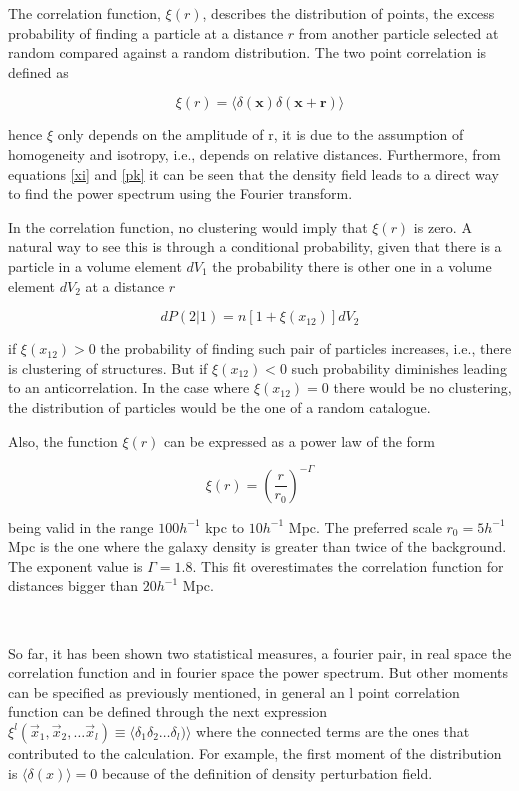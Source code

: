 The correlation function, $\xi(r)$, describes the distribution of points, the excess probability of finding a particle at a distance $r$ from another particle selected at random compared against a random distribution. The two point correlation is defined as 

\begin{equation}
\xi (r) =  \langle  \delta(\textbf{x})\delta(\textbf{x}+\textbf{r}) \rangle
\label{xi}
\end{equation}

hence $\xi$ only depends on the amplitude of r, it is due to the assumption of homogeneity
and isotropy, i.e., depends on relative distances. 
Furthermore, from equations \ref{xi} and \ref{pk} it can be seen that the density field 
leads to a direct way to find the power spectrum using the Fourier transform.

In the correlation function, no clustering would imply that $\xi(r)$ is zero. 
A natural way to see this is through a conditional probability, given that there 
is a particle in a volume element $dV_1$
the probability there is other one in a volume element $dV_2$ at a distance $r$

\[dP(2|1) = n[1+\xi(x_{12})]dV_2\]

if $\xi(x_{12})>0$ the probability of finding such pair of particles increases,
i.e., there is clustering of structures. But if $\xi(x_{12})<0$ such probability 
diminishes leading to an anticorrelation.  In the case where $\xi(x_{12})=0$ 
there would be no clustering, the distribution of particles would be the one of 
a random catalogue. 

Also, the function $\xi(r)$ can be expressed as a power law of the form

\begin{equation}
\xi(r) = \left( \frac{r}{r_0} \right)^{-\Gamma}
\label{powlaw}
\end{equation}


being valid in the range $100 h^{-1}$ kpc to $10h^{-1}$ Mpc. The preferred
scale $r_0=5h^{-1}$ Mpc is the one where the galaxy density is greater than twice 
of the background. The exponent value is $\Gamma = 1.8$. This fit overestimates
the correlation function for distances bigger than $20 h^{-1}$ Mpc.  


\
 
So far, it has been shown two statistical measures, a fourier pair, in real space the 
correlation function and in fourier space the power spectrum. 
But other moments can be specified as previously mentioned, in general an l point 
correlation function can be defined through the next expression 
$\xi^l(\vec{x}_1,\vec{x}_2,\ldots \vec{x}_l) \equiv  \langle  \delta_1\delta_2 \ldots\delta_l)\rangle $ where the connected terms are the ones that contributed to the calculation.
For example, the first moment of the distribution is $\langle \delta(x) \rangle = 0$ because 
of the definition of density perturbation field. 

